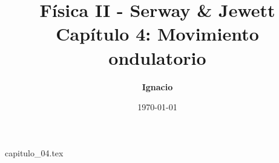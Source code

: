 \documentclass[11pt,spanish,oneside]{report}
\title{\textbf{Física II - Serway \& Jewett} \\ \Large Capítulo 4: Movimiento ondulatorio}
\author{\textbf{Ignacio}}
\date{\today}
\begin{document}
\maketitle

{capitulo_04.tex}
\end{document}
